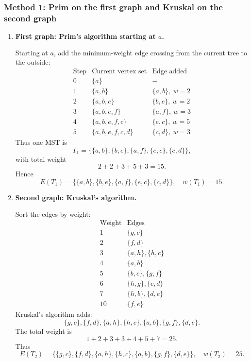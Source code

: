 \documentclass[12pt]{article}
\begin{document}
\subsubsection{Method 1: Prim on the first graph and Kruskal on the second graph}
\begin{enumerate}[label=(\alph*)]
  \item \textbf{First graph: Prim's algorithm starting at $a$.}

  Starting at $a$, add the minimum-weight edge crossing from the current tree to the outside:
  \[
  \begin{array}{c|c|c}
  \text{Step} & \text{Current vertex set} & \text{Edge added}\\ \hline
  0 & \{a\} & -\\
  1 & \{a,b\} & \{a,b\},\ w=2\\
  2 & \{a,b,e\} & \{b,e\},\ w=2\\
  3 & \{a,b,e,f\} & \{a,f\},\ w=3\\
  4 & \{a,b,e,f,c\} & \{e,c\},\ w=5\\
  5 & \{a,b,e,f,c,d\} & \{c,d\},\ w=3
  \end{array}
  \]
  Thus one MST is
  \[
    T_1=\{\{a,b\},\{b,e\},\{a,f\},\{e,c\},\{c,d\}\},
  \]
  with total weight
  \[
    2+2+3+5+3=15.
  \]
  Hence
  \[
    \boxed{E(T_1)=\{\{a,b\},\{b,e\},\{a,f\},\{e,c\},\{c,d\}\},\quad w(T_1)=15.}
  \]

  \item \textbf{Second graph: Kruskal's algorithm.}

  Sort the edges by weight:
  \[
  \begin{array}{c|c}
  \text{Weight} & \text{Edges}\\ \hline
  1 & \{g,c\}\\
  2 & \{f,d\}\\
  3 & \{a,h\},\{h,c\}\\
  4 & \{a,b\}\\
  5 & \{b,c\},\{g,f\}\\
  6 & \{h,g\},\{c,d\}\\
  7 & \{h,b\},\{d,e\}\\
  10 & \{f,e\}
  \end{array}
  \]
  Kruskal's algorithm adds:
  \[
    \{g,c\},\{f,d\},\{a,h\},\{h,c\},\{a,b\},\{g,f\},\{d,e\}.
  \]
  The total weight is
  \[
    1+2+3+3+4+5+7=25.
  \]
  Thus
  \[
    \boxed{
    E(T_2)=\{\{g,c\},\{f,d\},\{a,h\},\{h,c\},\{a,b\},\{g,f\},\{d,e\}\},
    \quad w(T_2)=25.}
  \]
\end{enumerate}
\end{document}
